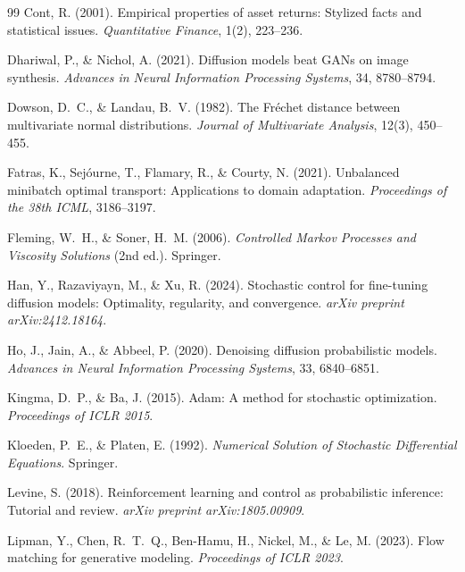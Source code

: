 \documentclass{article}
\begin{document}
\begin{thebibliography}{99}
Cont, R. (2001).
\newblock Empirical properties of asset returns: Stylized facts and statistical
  issues.
\newblock \emph{Quantitative Finance}, 1(2), 223--236.

Dhariwal, P., \& Nichol, A. (2021).
\newblock Diffusion models beat GANs on image synthesis.
\newblock \emph{Advances in Neural Information Processing Systems}, 34,
  8780--8794.

Dowson, D.~C., \& Landau, B.~V. (1982).
\newblock The Fr\'{e}chet distance between multivariate normal distributions.
\newblock \emph{Journal of Multivariate Analysis}, 12(3), 450--455.

Fatras, K., Sej\'{o}urne, T., Flamary, R., \& Courty, N. (2021).
\newblock Unbalanced minibatch optimal transport: Applications to domain
  adaptation.
\newblock \emph{Proceedings of the 38th ICML}, 3186--3197.

Fleming, W.~H., \& Soner, H.~M. (2006).
\newblock \emph{Controlled Markov Processes and Viscosity Solutions} (2nd ed.).
\newblock Springer.

Han, Y., Razaviyayn, M., \& Xu, R. (2024).
\newblock Stochastic control for fine-tuning diffusion models: Optimality,
  regularity, and convergence.
\newblock \emph{arXiv preprint arXiv:2412.18164}.

Ho, J., Jain, A., \& Abbeel, P. (2020).
\newblock Denoising diffusion probabilistic models.
\newblock \emph{Advances in Neural Information Processing Systems}, 33,
  6840--6851.

Kingma, D.~P., \& Ba, J. (2015).
\newblock Adam: A method for stochastic optimization.
\newblock \emph{Proceedings of ICLR 2015}.

Kloeden, P.~E., \& Platen, E. (1992).
\newblock \emph{Numerical Solution of Stochastic Differential Equations}.
\newblock Springer.

Levine, S. (2018).
\newblock Reinforcement learning and control as probabilistic inference:
  Tutorial and review.
\newblock \emph{arXiv preprint arXiv:1805.00909}.

Lipman, Y., Chen, R.~T.~Q., Ben-Hamu, H., Nickel, M., \& Le, M. (2023).
\newblock Flow matching for generative modeling.
\newblock \emph{Proceedings of ICLR 2023}.


\end{thebibliography}
\end{document}
